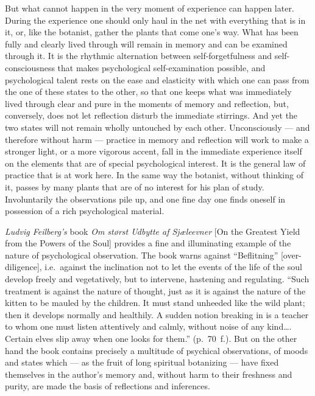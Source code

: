 \documentclass[12pt,a4paper]{book}
\newcommand{\opage}[1]{\marginnote{\footnotesize\textit{[#1]}}}
\begin{document}
But what cannot happen in the very moment of experience can happen
later. During the experience one should only haul in the net with
everything that is in it, or, like the botanist, gather the plants that
come one's way. What has been fully and clearly lived through will remain
in memory and can be examined through it. It is the rhythmic alternation
between self-forgetfulness and self-consciousness that makes
psychological self-examination possible, and psychological talent rests
on the ease and elasticity with which one can pass from the one of these
states to the other, so that one keeps what was immediately lived through
clear and pure in the moments of memory and reflection, but, conversely,
does not let reflection disturb the immediate stirrings. And yet the two
states will not remain wholly untouched by each other. Unconsciously ---
and therefore without harm --- practice in memory and reflection will
work to make a stronger light, or a more vigorous accent, fall in the
immediate experience itself on the elements that are of special
psychological interest. It is the general law of practice that is at
work here. In the same way the botanist, without thinking of it, passes
by many plants that are of no interest for his plan of study.
Involuntarily the observations pile up, and one fine day one finds
oneself in possession of a rich psychological material.

\emph{Ludvig Feilberg's} book \textit{Om størst Udbytte af Sjæleevner}
[On the Greatest Yield from the Powers of the Soul] provides a fine and
illuminating example of the nature of psychological observation. The book
warns against ``Beflitning'' [over-diligence], i.e.\ against the
inclination not to let the events of the life of the soul develop freely
and vegetatively, but to intervene, hastening
\opage{21}and regulating. ``Such treatment is against the nature of
thought, just as it is against the nature of the kitten to be mauled by
the children. It must stand unheeded like the wild plant; then it
develops normally and healthily. A sudden notion breaking in is a teacher
to whom one must listen attentively and calmly, without noise of any
kind\ldots. Certain elves slip away when one looks for them.''
(p.~70~f.). But on the other hand the book contains precisely a
multitude of psychical observations, of moods and states which --- as
the fruit of long spiritual botanizing --- have fixed themselves in the
author's memory and, without harm to their freshness and purity, are
made the basis of reflections and inferences.
\end{document}
